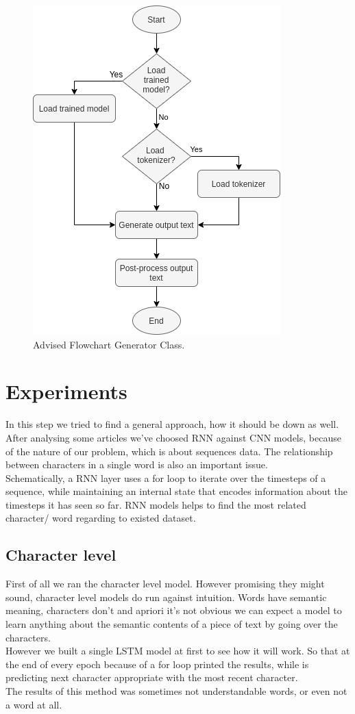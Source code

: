 \documentclass[conference]{IEEEtran}
\begin{document}
\begin{figure}[htbp]
\centerline{\includegraphics[scale=0.65]{pictures/flowchart_generator.png}}
\caption{Advised Flowchart Generator Class.}
\label{fig:flowchart_generator}
\end{figure}

\section{Experiments}

In this step we tried to find a general approach, how it should be down as well. After analysing some articles we’ve choosed RNN against CNN models, because of the nature of our problem, which is about sequences data. The relationship between characters in a single word is also an important issue.\\
Schematically, a RNN layer uses a for loop to iterate over the timesteps of a sequence, while maintaining an internal state that encodes information about the timesteps it has seen so far. RNN models helps to find the most related character/ word regarding to existed dataset.

\subsection{Character level}

First of all we ran the character level model. However promising they might sound, character level models do run against intuition. Words have semantic meaning, characters don't and apriori it's not obvious we can expect a model to learn anything about the semantic contents of a piece of text by going over the characters.\\
However we built a single LSTM model at first to see how it will work. So that at the end of every epoch because of a for loop printed the results, while is predicting next character appropriate with the most recent character.\\
The results of this method was sometimes not understandable words, or even not a word at all.
\end{document}
